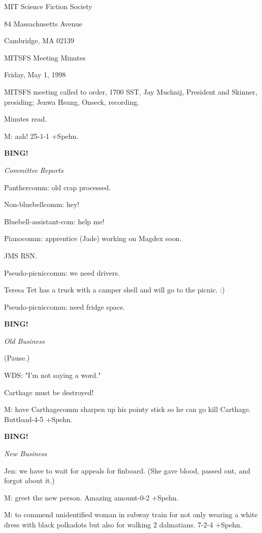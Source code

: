 \documentclass[12pt]{article}
\newcommand{\bing}{{\bf BING!} }
\newcommand{\goto}[1]{\bing \vskip 12pt \centerline{{\em{#1}}}}
\begin{document}
\begin{center}

MIT Science Fiction Society 

84 Massachusetts Avenue

Cambridge, MA 02139

\vspace{12pt}

MITSFS Meeting Minutes 

Friday, May 1, 1998

\end{center}
 
\vspace{18pt}

\setlength{\parskip}{6pt}

\noindent
MITSFS meeting called to order, 1700 SST,
Jay Muchnij, President and Skinner, presiding; Jenwa Hsung, Onseck, recording.

Minutes read.

M: aah! 25-1-1 +Spehn.

\goto{Committee Reports}

Panthercomm: old crap processed.

Non-bluebellcomm: hey!

Bluebell-assistant-com: help me!

Pianocomm: apprentice (Jade) working on Magdex soon.

JMS RSN.

Pseudo-picniccomm: we need drivers.

Teresa Tet has a truck with a camper shell and will go to the picnic. :)

Pseudo-picniccomm: need fridge space.

\goto{Old Business}

(Pause.)

WDS: "I'm not saying a word."

Carthage must be destroyed!

M: have Carthagecomm sharpen up his pointy stick so he can go kill Carthage. Buttload-4-5 +Spehn.

\goto{New Business}

Jen: we have to wait for appeals for finboard. (She gave blood, passed out, and forgot about it.)

M: greet the new person. Amazing amount-0-2 +Spehn.

M: to commend unidentified woman in subway train for not only wearing a white dress with black polkadots but also for walking 2 dalmatians. 7-2-4 +Spehn.
\end{document}
